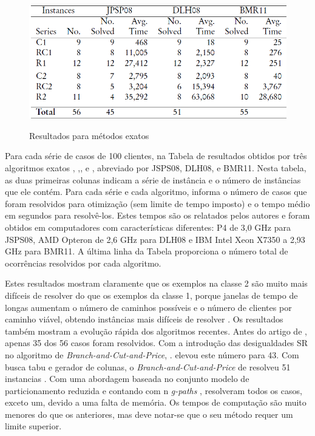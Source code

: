 \begin{figure}[ht!]
\centering
\includegraphics[scale=0.8]{figuras/rme.PNG}
\label{rme}
\caption{Resultados para métodos exatos}
\end{figure}

Para cada série de casos de 100 clientes, na Tabela de resultados obtidos por três algoritmos exatos , \cite{jepsen13},\cite{desaulniers14}, e \cite{baldacci11}, abreviado por JSPS08, DLH08, e BMR11. Nesta tabela, as duas primeiras colunas indicam a série de instância e o número de instâncias que ele contém. Para cada série e cada algoritmo, informa o número de casos que foram resolvidos para otimização (sem limite de tempo imposto) e o tempo médio em segundos para resolvê-los. Estes tempos são os relatados pelos autores e foram obtidos em computadores com características diferentes: P4 de 3,0 GHz para JSPS08, AMD Opteron de 2,6 GHz para DLH08 e IBM Intel Xeon X7350 a 2,93 GHz para BMR11. A última linha da Tabela proporciona o número total de ocorrências resolvidos por cada algoritmo.

Estes resultados mostram claramente que os exemplos na classe 2 são muito mais difíceis de resolver do que os exemplos da classe 1, porque janelas de tempo de longas aumentam o número de caminhos possíveis e o número de clientes por caminho viável, obtendo instâncias mais difíceis de resolver . Os resultados também mostram a evolução rápida dos algoritmos recentes. Antes do artigo de \cite{jepsen13}, apenas 35 dos 56 casos foram resolvidos. Com a introdução das desigualdades SR no algoritmo de \textit{Branch-and-Cut-and-Price}, \cite{jepsen13}. elevou este número para 43. Com busca tabu e gerador de colunas, o \textit{Branch-and-Cut-and-Price} de \cite{desaulniers14} resolveu 51 instancias . Com uma abordagem baseada no conjunto modelo de particionamento reduzida e contando com n \textit{g-paths} , \cite{baldacci11} resolveram todos os casos, exceto um, devido a uma falta de memória. Os tempos de computação são muito menores do que os anteriores, mas deve notar-se que o seu método requer um limite superior.

